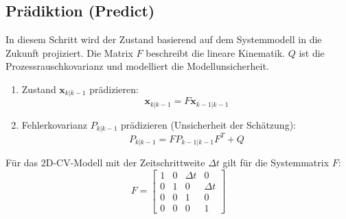 \subsection{Prädiktion (Predict)}
In diesem Schritt wird der Zustand basierend auf dem Systemmodell in die Zukunft projiziert. Die Matrix $F$ beschreibt die lineare Kinematik. $Q$ ist die Prozessrauschkovarianz und modelliert die Modellunsicherheit.
\begin{enumerate}
    \item Zustand $\mathbf{x}_{k|k-1}$ prädizieren:
        \begin{equation}
            \mathbf{x}_{k|k-1} = F \mathbf{x}_{k-1|k-1}
        \end{equation}
    \item Fehlerkovarianz $P_{k|k-1}$ prädizieren (Unsicherheit der Schätzung):
        \begin{equation}
            P_{k|k-1} = F P_{k-1|k-1} F^T + Q
        \end{equation}
\end{enumerate}
Für das 2D-CV-Modell mit der Zeitschrittweite $\Delta t$ gilt für die Systemmatrix $F$:
\begin{equation}
    F = \begin{bmatrix} 
    1 & 0 & \Delta t & 0 \\ 
    0 & 1 & 0 & \Delta t \\ 
    0 & 0 & 1 & 0 \\ 
    0 & 0 & 0 & 1 
    \end{bmatrix}
\end{equation}

